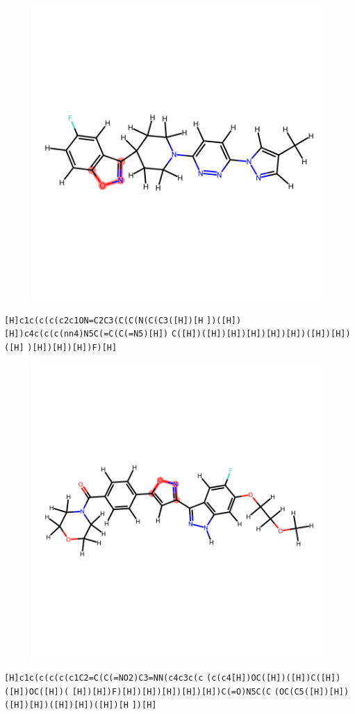 \documentclass{article}
\begin{document}
\begin{figure}[ht]
\centering
    \includegraphics{mol14.png}
\end{figure}
\verb|[H]c1c(c(c(c2c1ON=C2C3(C(C(N(C(C3([H])[H| \verb|])([H])[H])c4c(c(c(nn4)N5C(=C(C(=N5)[H])| \verb|C([H])([H])[H])[H])[H])[H])([H])[H])([H]| \verb|)[H])[H])[H])F)[H]|

\begin{figure}[ht]
\centering
    \includegraphics{mol15.png}
\end{figure}
\verb|[H]c1c(c(c(c(c1C2=C(C(=NO2)C3=NN(c4c3c(c| \verb|(c(c4[H])OC([H])([H])C([H])([H])OC([H])(| \verb|[H])[H])F)[H])[H])[H])[H])[H])C(=O)N5C(C| \verb|(OC(C5([H])[H])([H])[H])([H])[H])([H])[H| \verb|])[H]|
\end{document}
